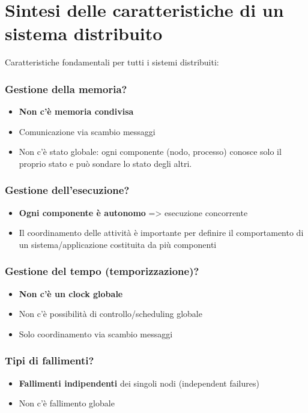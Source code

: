 \section{Sintesi delle caratteristiche di un sistema distribuito}
Caratteristiche fondamentali per tutti i sistemi distribuiti:
\subsubsection{Gestione della memoria?}
\begin{itemize}
    \item \textbf{Non c'è memoria condivisa}
    \item Comunicazione via scambio messaggi
    \item Non c'è stato globale: ogni componente (nodo, processo) conosce solo il proprio stato e può sondare lo stato degli altri.
\end{itemize}

\subsubsection{Gestione dell'esecuzione?}
\begin{itemize}
    \item \textbf{Ogni componente è autonomo} => esecuzione concorrente
    \item Il coordinamento delle attività è importante per definire il comportamento di un sistema/applicazione costituita da più componenti
\end{itemize}

\subsubsection{Gestione del tempo (temporizzazione)?}
\begin{itemize}
    \item \textbf{Non c'è un clock globale}
    \item Non c'è possibilità di controllo/scheduling globale
    \item Solo coordinamento via scambio messaggi
\end{itemize}

\subsubsection{Tipi di fallimenti?}
\begin{itemize}
    \item \textbf{Fallimenti indipendenti} dei singoli nodi (independent failures)
    \item Non c'è fallimento globale
\end{itemize}

